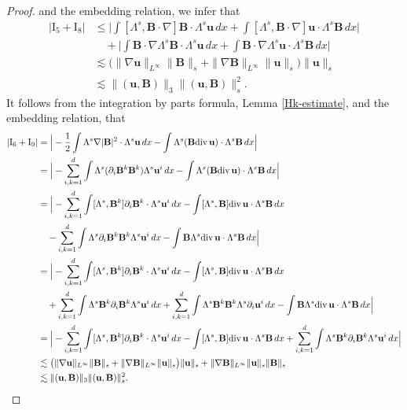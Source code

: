 \documentclass[12pt, reqno]{amsart}
\numberwithin{equation}{section}
\numberwithin{equation}{section}
\def\div{ \hbox{\rm div}\,  }
\numberwithin{equation}{section}
\numberwithin{equation}{section}
\theoremstyle{remark}
\def\div{ \hbox{\rm div}\,  }
\def\u{ \mathbf{u} }
\def\b{ \mathbf{B} }
\begin{document}
\begin{proof}
and the embedding relation, we infer that
\begin{equation*}\begin{split}
|\textrm{I}_{5}+\textrm{I}_{8}|&\leq\Big|\int[\Lambda^s,\b\cdot\nabla] \b\cdot\Lambda^s \u \,dx+\int[\Lambda^s,\b\cdot\nabla] \u\cdot\Lambda^s \b \,dx\Big|
\\&\quad+\Big|\int \b\cdot\nabla\Lambda^s\b\cdot\Lambda^s \u \,dx+\int \b\cdot\nabla\Lambda^s \u\cdot\Lambda^s\b \,dx\Big|
\\&\lesssim\big(\|\nabla \u\|_{L^\infty}\| \b\|_s+\|\nabla \b\|_{L^\infty}\|\u\|_s\big )\|\u\|_s\\&\lesssim\|(\u,\b)\|_{3}\|(\u,\b)\|^{2}_s.
\end{split}\end{equation*}
It follows from the integration by parts formula, Lemma \ref{Hk-estimate}, %
and the embedding relation,  that
\begin{equation*}\begin{split}
  |\textrm{I}_{6}+\textrm{I}_{9}|
  &=\Big|-\frac12\int\Lambda^s\nabla|\b|^2\cdot\Lambda^s\u \,dx-\int\Lambda^s(\b\div \u)\cdot\Lambda^s\b \,dx\Big|
  \\&=\Big|-\sum_{i,k=1}^{d}\int\Lambda^s(\partial_{i}\b^k\b^k)\Lambda^s\u^{i} \,dx-\int\Lambda^s(\b\div \u)\cdot\Lambda^s \b \,dx\Big|
  \\&=\Big|-\sum_{i,k=1}^{d}\int[\Lambda^s,\b^k]\partial_{i}\b^k\cdot\Lambda^s \u^{i}\,dx-\int[\Lambda^s,\b]\div \u\cdot\Lambda^s \b \,dx\\&\quad-\sum_{i,k=1}^{d}\int\Lambda^s\partial_{i}\b^k\b^k\Lambda^s\u^{i}\,dx-\int \b\Lambda^s\div \u\cdot\Lambda^s \b \,dx\Big|
  \\&=\Big|-\sum_{i,k=1}^{d}\int[\Lambda^s,\b^k]\partial_{i}\b^k\cdot\Lambda^s\u^{i}\,dx-\int[\Lambda^s,\b]\div \u\cdot\Lambda^s \b \,dx\\&\quad+\sum_{i,k=1}^{d}\int\Lambda^s\b^k\partial_{i}\b^k\Lambda^s\u^{i}\,dx+\sum_{i,k=1}^{d}\int\Lambda^s\b^k\b^k\Lambda^s\partial_{i}\u^{i}\,dx
  -\int \b\Lambda^s\div \u\cdot\Lambda^s \b \,dx\Big|
  \\
  &=\Big|-\sum_{i,k=1}^{d}\int[\Lambda^s,\b^k]\partial_{i}\b^k\cdot\Lambda^s\u^{i}\,dx-\int[\Lambda^s,\b]\div \u\cdot\Lambda^s \b \,dx+\sum_{i,k=1}^{d}\int\Lambda^s\b^k\partial_{i}\b^k\Lambda^s\u^{i}\,dx\Big|
  \\&\lesssim\big(\|\nabla \u\|_{L^\infty}\| \b\|_s+\|\nabla \b\|_{L^\infty}\|\u\|_s\big)\|\u\|_s+\|\nabla \b\|_{L^\infty}\|\u\|_s\|\b\|_s\\&\lesssim\|(\u,\b)\|_{3}\|(\u,\b)\|^{2}_s.

\end{split}
\end{equation*}
\end{proof}
\end{document}
